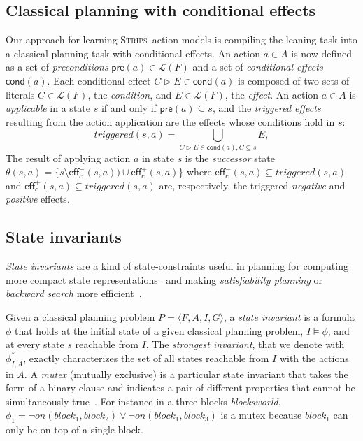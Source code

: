 \documentclass{article}
\newcommand{\tup}[1]{{\langle #1 \rangle}}
\newcommand{\pre}{\mathsf{pre}}     %
\newcommand{\eff}{\mathsf{eff}}     %
\newcommand{\cond}{\mathsf{cond}}   %
\newcommand{\strips}{\textsc{Strips}}     %
\begin{document}
\subsection{Classical planning with conditional effects}
Our approach for learning \strips\ action models is compiling the leaning task into a classical planning task with conditional effects. An action $a\in A$ is now defined as a set of {\em preconditions} $\pre(a)\in\mathcal{L}(F)$ and a set of {\em conditional effects} $\cond(a)$. Each conditional effect $C\rhd E\in\cond(a)$ is composed of two sets of literals $C\in\mathcal{L}(F)$, the {\em condition}, and $E\in\mathcal{L}(F)$, the {\em effect}. An action $a\in A$ is {\em applicable} in a state $s$ if and only if $\pre(a)\subseteq s$, and the {\em triggered effects} resulting from the action application are the effects whose conditions hold in $s$:
\[
triggered(s,a)=\bigcup_{C\rhd E\in\cond(a),C\subseteq s} E,
\]
The result of applying action $a$ in state $s$ is the {\em successor} state $\theta(s,a)=\{s\setminus\eff_c^-(s,a))\cup\eff_c^+(s,a)\}$ where $\eff_c^-(s,a)\subseteq triggered(s,a)$ and $\eff_c^+(s,a)\subseteq triggered(s,a)$ are, respectively, the triggered {\em negative} and {\em positive} effects.


\subsection{State invariants}
{\em State invariants} are a kind of state-constraints useful in planning for computing more compact state representations~\cite{helmert2009concise} and making {\em satisfiability planning} or {\em backward search} more efficient~\cite{rintanen2014madagascar,alcazar2015reminder}.

Given a classical planning problem $P=\tup{F,A,I,G}$, a {\em state invariant} is a formula $\phi$ that holds at the initial state of a given classical planning problem, $I\models \phi$, and at every state $s$ reachable from $I$. The {\em strongest invariant}, that we denote with $\phi_{I,A}^*$, exactly characterizes the set of all states reachable from $I$ with the actions in $A$. A {\em mutex} (mutually exclusive) is a particular state invariant that takes the form of a binary clause and indicates a pair of different properties that cannot be simultaneously true~\cite{kautz:mutex:IJCAI1999}. For instance in a three-blocks {\em blocksworld}, $\phi_1=\neg on(block_1,block_2)\vee \neg on(block_1,block_3)$ is a mutex because $block_1$ can only be on top of a single block. 
\end{document}
